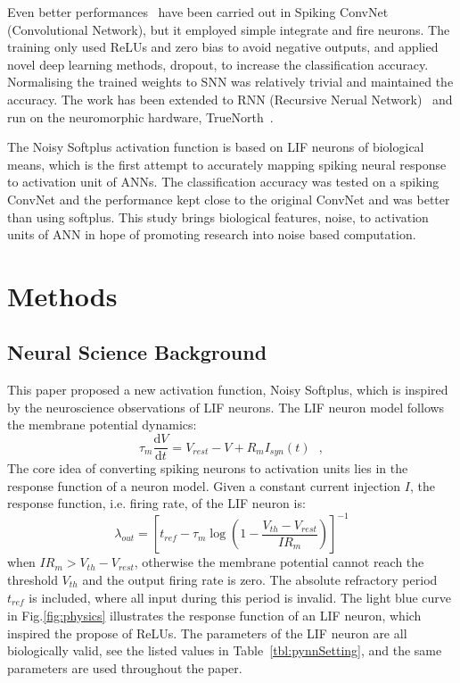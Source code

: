 \documentclass[runningheads,a4paper]{llncs}
\def\D{\mathrm{d}}
\begin{document}
Even better performances~\cite{cao2015spiking,diehl2015fast} have been carried out in Spiking ConvNet (Convolutional Network), but it employed simple integrate and fire neurons.
The training only used ReLUs and zero bias to avoid negative outputs, and applied novel deep learning methods, dropout, to increase the classification accuracy.
Normalising the trained weights to SNN was relatively trivial and maintained the accuracy.
The work has been extended to RNN (Recursive Nerual Network)~\cite{diehl2016conversion} and run on the neuromorphic hardware, TrueNorth~\cite{merolla2014million}.
 
The Noisy Softplus activation function is based on LIF neurons of biological means, which is the first attempt to accurately mapping spiking neural response to activation unit of ANNs.
The classification accuracy was tested on a spiking ConvNet and the performance kept close to the original ConvNet and was better than using softplus.
This study brings biological features, noise, to activation units of ANN in hope of promoting research into noise based computation.
\section{Methods}
\subsection{Neural Science Background}
This paper proposed a new activation function, Noisy Softplus, which is inspired by the neuroscience observations of LIF neurons.
The LIF neuron model follows the membrane potential dynamics:
\begin{equation}
\tau_m \frac{\D V}{\D t}=V_{rest} - V + R_{m} I_{syn}(t) ~~~,
\label{eq:LIF}
\end{equation}
The core idea of converting spiking neurons to activation units lies in the response function of a neuron model.
Given a constant current injection $I$, the response function, i.e. firing rate, of the LIF neuron is:
\begin{equation}
\lambda_\mathit{out}=
\left [ t_\mathit{ref}-\tau_m\log \left ( 1-\frac{V_{th}-V_\mathit{rest}}{IR_m}  \right )\right ]^{-1}
\label{equ:consI}
\end{equation}
when $IR_m>V_{th}-V_{rest}$, otherwise the membrane potential cannot reach the threshold $V_{th}$ and the output firing rate is zero. 
The absolute refractory period $t_\mathit{ref}$ is included, where all input during this period is invalid.
The light blue curve in Fig.\ref{fig:physics} illustrates the response function of an LIF neuron, which inspired the propose of ReLUs.
The parameters of the LIF neuron are all biologically valid, see the listed values in Table~\ref{tbl:pynnSetting}, and the same parameters are used throughout the paper.
\end{document}
